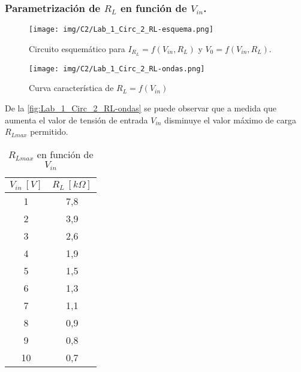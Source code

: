 \subsubsection{Parametrización de $R_L$ en función de $V_{in}$.}
\begin{figure}[H]
    \texttt{[image: img/C2/Lab\_1\_Circ\_2\_RL-esquema.png]}
    \caption{Circuito esquemático para $I_{R_L}=f(V_{in}, R_L)$ y $V_0=f(V_{in}, R_L)$.}
    \label{fig:Lab_1_Circ_2_RL-esquema}
\end{figure}
\begin{figure}[H]
    \centering
    \texttt{[image: img/C2/Lab\_1\_Circ\_2\_RL-ondas.png]}
    \caption{Curva característica de $R_L=f(V_{in})$}
    \label{fig:Lab_1_Circ_2_RL-ondas}
\end{figure}
De la \autoref{fig:Lab_1_Circ_2_RL-ondas} se puede observar que a medida que aumenta el valor de tensión de entrada $V_{in}$ disminuye el valor máximo de carga $R_{Lmax}$ permitido.

\begin{table}[H]
    \centering
    \begin{tabular}{|c|c|} \hline 
         $V_{in}~[V]$& $R_L~[k\Omega]$\\ \hline 
         1& 7,8\\ \hline 
         2& 3,9\\ \hline 
         3& 2,6\\ \hline 
         4& 1,9\\ \hline 
         5& 1,5\\ \hline 
         6& 1,3\\ \hline 
         7& 1,1\\ \hline 
         8& 0,9\\ \hline 
         9& 0,8\\ \hline 
       10& 0,7\\ \hline
    \end{tabular}
    \caption{$R_{Lmax}$ en función de $V_{in}$}
    \label{tab:RL=f(Vin)}
\end{table}

